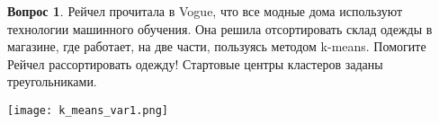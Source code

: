 \documentclass[12pt]{article}
\theoremstyle{definition}
\newtheorem{question}{Вопрос}
\begin{document}
\newpage 

\begin{question}
Рейчел прочитала в Vogue, что все модные дома используют технологии машинного обучения. Она решила отсортировать склад одежды в магазине, где работает, на две части, пользуясь методом k-means. Помогите Рейчел рассортировать одежду! Стартовые центры кластеров заданы треугольниками.
\begin{center}
    \texttt{[image: k\_means\_var1.png]}
\end{center}
\end{question}
\end{document}
